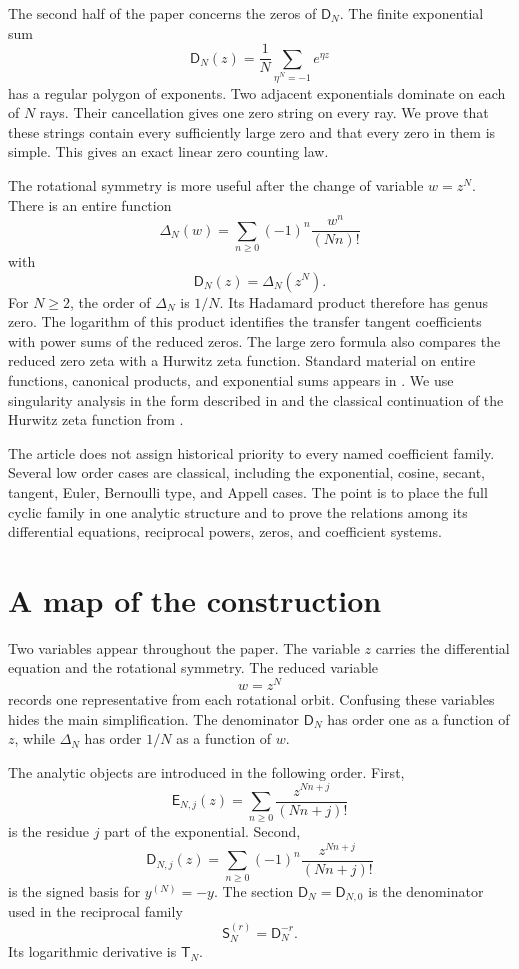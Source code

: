 \documentclass{aomart}
\theoremstyle{definition}
\theoremstyle{remark}
\newcommand{\Dfun}{\mathsf D}
\newcommand{\Efun}{\mathsf E}
\newcommand{\Sfun}{\mathsf S}
\newcommand{\Tfun}{\mathsf T}
\begin{document}
The second half of the paper concerns the zeros of $\Dfun_N$.  The finite exponential sum
\[
\Dfun_N(z)=\frac1N\sum_{\eta^N=-1}e^{\eta z}
\]
has a regular polygon of exponents.  Two adjacent exponentials dominate on each of $N$ rays.  Their cancellation gives one zero string on every ray.  We prove that these strings contain every sufficiently large zero and that every zero in them is simple.  This gives an exact linear zero counting law.

The rotational symmetry is more useful after the change of variable $w=z^N$.  There is an entire function
\[
\Delta_N(w)=\sum_{n\geq 0}(-1)^n\frac{w^n}{(Nn)!}
\]
with
\[
\Dfun_N(z)=\Delta_N(z^N).
\]
For $N\geq2$, the order of $\Delta_N$ is $1/N$.  Its Hadamard product therefore has genus zero.  The logarithm of this product identifies the transfer tangent coefficients with power sums of the reduced zeros.  The large zero formula also compares the reduced zero zeta with a Hurwitz zeta function.  Standard material on entire functions, canonical products, and exponential sums appears in \cite{Boas1954,Levin1980,Titchmarsh1939}.  We use singularity analysis in the form described in \cite{FlajoletSedgewick2009} and the classical continuation of the Hurwitz zeta function from \cite{Apostol1976}.

The article does not assign historical priority to every named coefficient family.  Several low order cases are classical, including the exponential, cosine, secant, tangent, Euler, Bernoulli type, and Appell cases.  The point is to place the full cyclic family in one analytic structure and to prove the relations among its differential equations, reciprocal powers, zeros, and coefficient systems.



\section{A map of the construction}\label{sec:map}

Two variables appear throughout the paper.  The variable $z$ carries the differential equation and the rotational symmetry.  The reduced variable
\[
w=z^N
\]
records one representative from each rotational orbit.  Confusing these variables hides the main simplification.  The denominator $\Dfun_N$ has order one as a function of $z$, while $\Delta_N$ has order $1/N$ as a function of $w$.

The analytic objects are introduced in the following order.  First,
\[
\Efun_{N,j}(z)
=
\sum_{n\geq0}\frac{z^{Nn+j}}{(Nn+j)!}
\]
is the residue $j$ part of the exponential.  Second,
\[
\Dfun_{N,j}(z)
=
\sum_{n\geq0}(-1)^n\frac{z^{Nn+j}}{(Nn+j)!}
\]
is the signed basis for $y^{(N)}=-y$.  The section $\Dfun_N=\Dfun_{N,0}$ is the denominator used in the reciprocal family
\[
\Sfun_N^{(r)}=\Dfun_N^{-r}.
\]
Its logarithmic derivative is $\Tfun_N$.
\end{document}
